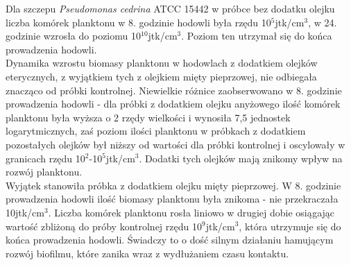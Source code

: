 \documentclass[11pt,a4paper]{report}
\begin{document}
Dla szczepu \textit{Pseudomonas cedrina} ATCC 15442 w próbce bez dodatku olejku liczba komórek planktonu w 8. godzinie hodowli była rzędu 10$^5$jtk/cm$^3$, w 24. godzinie wzrosła do poziomu 10$^10$jtk/cm$^3$. Poziom ten utrzymał się do końca prowadzenia hodowli.\\
Dynamika wzrostu biomasy planktonu w hodowlach z dodatkiem olejków eterycznych, z wyjątkiem tych z olejkiem mięty pieprzowej, nie odbiegała znacząco od próbki kontrolnej. Niewielkie różnice zaobserwowano w 8. godzinie prowadzenia hodowli - dla próbki z dodatkiem olejku anyżowego ilość komórek planktonu była wyższa o 2 rzędy wielkości i wynosiła 7,5 jednostek logarytmicznych, zaś poziom ilości planktonu w próbkach z dodatkiem pozostałych olejków był niższy od wartości dla próbki kontrolnej i oscylowały w granicach rzędu 10$^2$-10$^5$jtk/cm$^3$. Dodatki tych olejków mają znikomy wpływ na rozwój planktonu.\\
Wyjątek stanowiła próbka z dodatkiem olejku mięty pieprzowej. W 8. godzinie prowadzenia hodowli ilość biomasy planktonu była znikoma - nie przekraczała 10jtk/cm$^3$. Liczba komórek planktonu rosła liniowo w drugiej dobie osiągając wartość zbliżoną do próby kontrolnej rzędu 10$^9$jtk/cm$^3$, która utrzymuje się do końca prowadzenia hodowli. Świadczy to o dość silnym działaniu hamującym rozwój biofilmu, które zanika wraz z wydłużaniem czasu kontaktu.
\end{document}

